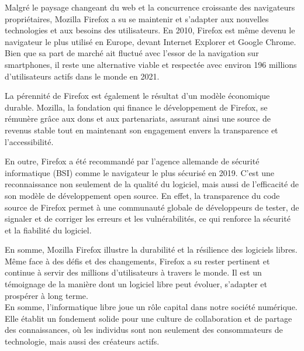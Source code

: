 Malgré le paysage changeant du web et la concurrence croissante des navigateurs propriétaires, Mozilla Firefox a su se maintenir et s'adapter aux nouvelles technologies et aux besoins des utilisateurs. En 2010, Firefox est même devenu le navigateur le plus utilisé en Europe, devant Internet Explorer et Google Chrome. Bien que sa part de marché ait fluctué avec l'essor de la navigation sur smartphones, il reste une alternative viable et respectée avec environ 196 millions d'utilisateurs actifs dans le monde en 2021.

La pérennité de Firefox est également le résultat d'un modèle économique durable. Mozilla, la fondation qui finance le développement de Firefox, se rémunère grâce aux dons et aux partenariats, assurant ainsi une source de revenus stable tout en maintenant son engagement envers la transparence et l'accessibilité.

En outre, Firefox a été recommandé par l'agence allemande de sécurité informatique (BSI) comme le navigateur le plus sécurisé en 2019. C'est une reconnaissance non seulement de la qualité du logiciel, mais aussi de l'efficacité de son modèle de développement open source. En effet, la transparence du code source de Firefox permet à une communauté globale de développeurs de tester, de signaler et de corriger les erreurs et les vulnérabilités, ce qui renforce la sécurité et la fiabilité du logiciel.

En somme, Mozilla Firefox illustre la durabilité et la résilience des logiciels libres. Même face à des défis et des changements, Firefox a su rester pertinent et continue à servir des millions d'utilisateurs à travers le monde. Il est un témoignage de la manière dont un logiciel libre peut évoluer, s'adapter et prospérer à long terme.\\



En somme, l'informatique libre joue un rôle capital dans notre société numérique. Elle établit un fondement solide pour une culture de collaboration et de partage des connaissances, où les individus sont non seulement des consommateurs de technologie, mais aussi des créateurs actifs.

